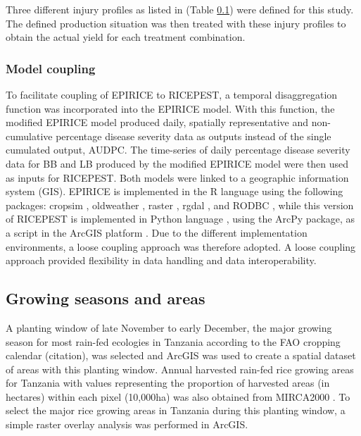\documentclass[preprint,12pt]{elsarticle}
\begin{document}
Three different injury profiles as listed in (Table \ref{}) were defined for this study. The defined production situation was then treated with these injury profiles to obtain the actual yield for each treatment combination.

\subsubsection{Model coupling}
To facilitate coupling of EPIRICE to RICEPEST, a temporal disaggregation function was incorporated into the EPIRICE model. With this function, the modified EPIRICE model produced daily, spatially representative and non-cumulative percentage disease severity data as outputs instead of the single cumulated output, AUDPC. The time-series of daily percentage disease severity data for BB and LB produced by the modified EPIRICE model were then used as inputs for RICEPEST. Both models were linked to a geographic information system (GIS). EPIRICE is implemented in the R language using the following packages: cropsim \cite{Hijmans2009}, oldweather \cite{Hijmans2009}, raster \cite{Hijmans2014}, rgdal \cite{Bivand2014}, and RODBC \cite{Ripley2013}, while this version of RICEPEST is implemented in Python language \cite{python}, using the ArcPy package, as a script in the ArcGIS platform \cite{ESRI2011}. Due to the different implementation environments, a loose coupling approach was therefore adopted. A loose coupling approach provided flexibility in data handling and data interoperability. 

\subsection{Growing seasons and areas}
A planting window of late November to early December, the major growing season for most rain-fed ecologies in Tanzania according to the FAO cropping calendar (citation), was selected and ArcGIS was used to create a spatial dataset of areas with this planting window. Annual harvested rain-fed rice growing areas for Tanzania with values representing the proportion of harvested areas (in hectares) within each pixel (10,000ha) was also obtained from MIRCA2000 \cite{Portmann2010}. To select the major rice growing areas in Tanzania during this planting window, a simple raster overlay analysis was performed in ArcGIS.
\end{document}
